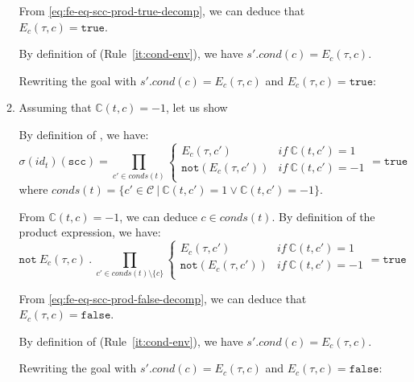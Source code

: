 \documentclass[dvipsnames,12pt]{article}
\begin{document}
\begin{niproof}
\begin{enumerate}
\begin{enumerate}
      From \eqref{eq:fe-eq-scc-prod-true-decomp}, we can deduce that
      $E_c(\tau,c)=\mathtt{true}$.

      By definition of \dwSitpn{} (Rule~\ref{it:cond-env}), we have
      $s'.cond(c)=E_c(\tau,c)$.
      
      Rewriting the goal with $s'.cond(c)=E_c(\tau,c)$ and
      $E_c(\tau,c)=\mathtt{true}$: 
      
    \item Assuming that $\mathbb{C}(t,c)=-1$, let us show

      By definition of \upSim, we have:
      \begin{equation}
        \sigma(id_t)(\texttt{scc})=\prod\limits_{c'\in{}conds(t)}
        \begin{cases}
          E_c(\tau,c') & if~\mathbb{C}(t,c')=1 \\
          \mathtt{not}(E_c(\tau,c')) & if~\mathbb{C}(t,c')=-1 \\
        \end{cases}=\mathtt{true}
        \label{eq:fe-eq-scc-prod-false}
      \end{equation}
      where
      $conds(t)=\{c'\in\mathcal{C}~\vert~\mathbb{C}(t,c')=1\lor\mathbb{C}(t,c')=-1\}$.

      From $\mathbb{C}(t,c)=-1$, we can deduce $c\in{}conds(t)$. By
      definition of the product expression, we have:
      \begin{equation}
        \label{eq:fe-eq-scc-prod-false-decomp}
        \mathtt{not}~E_c(\tau,c)~.~\prod\limits_{c'\in{}conds(t)\setminus\{c\}}
        \begin{cases}
          E_c(\tau,c') & if~\mathbb{C}(t,c')=1 \\
          \mathtt{not}(E_c(\tau,c')) & if~\mathbb{C}(t,c')=-1 \\
        \end{cases}=\mathtt{true}
      \end{equation}

      From \eqref{eq:fe-eq-scc-prod-false-decomp}, we can deduce that
      $E_c(\tau,c)=\mathtt{false}$.

      By definition of \dwSitpn{} (Rule~\ref{it:cond-env}), we have
      $s'.cond(c)=E_c(\tau,c)$.
      
      Rewriting the goal with $s'.cond(c)=E_c(\tau,c)$ and
      $E_c(\tau,c)=\mathtt{false}$: 
    \end{enumerate}
    

\end{enumerate}
\end{niproof}
\end{document}
